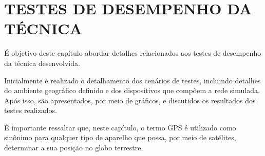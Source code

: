 \chapter{TESTES DE DESEMPENHO DA TÉCNICA} \label{cap:testes}

É objetivo deste capítulo abordar detalhes relacionados aos testes de desempenho da técnica desenvolvida.

Inicialmente é realizado o detalhamento dos cenários de testes, incluindo detalhes do ambiente geográfico definido e dos dispositivos que compõem a rede simulada. Após isso, são apresentados, por meio de gráficos, e discutidos os resultados dos testes realizados.

É importante ressaltar que, neste capítulo, o termo GPS é utilizado como sinônimo para qualquer tipo de aparelho que possa, por meio de satélites, determinar a sua posição no globo terrestre.





